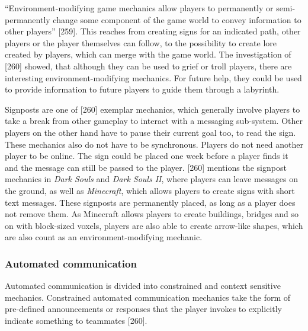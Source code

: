 ``Environment-modifying game mechanics allow players to permanently or semi-permanently change some component of the game world to convey information to other players'' \autocite{Toups2014ATheory}[259].
This reaches from creating signs for an indicated path, other players or the player themselves can follow, to the possibility to create lore created by players, which can merge with the game world. The investigation of \textcite{Toups2014ATheory}[260] showed, that although they can be used to grief or troll players, there are interesting environment-modifying mechanics.
For future help, they could be used to provide information to future players to guide them through a labyrinth.

Signposts are one of \textcite{Toups2014ATheory}[260] exemplar mechanics, which generally involve players to take a break from other gameplay to interact with a messaging sub-system. Other players on the other hand have to pause their current goal too, to read the sign. These mechanics also do not have to be synchronous.
Players do not need another player to be online. The sign could be placed one week before a player finds it and the message can still be passed to the player. \textcite{Cheung2012CommunicationGaming}[260] mentions the signpost mechanics in \textit{Dark Souls} and \textit{Dark Souls II}, where players can leave messages on the ground, as well as \textit{Minecraft}, which allows players to create signs with short text messages. These signposts are permanently placed, as long as a player does not remove them. As Minecraft allows players to create buildings, bridges and so on with block-sized voxels, players are also able to create arrow-like shapes, which are also count as an environment-modifying mechanic.


\subsubsection{Automated communication}
\label{section:Automated communication}

Automated communication is divided into constrained and context sensitive mechanics.
Constrained automated communication mechanics take the form of pre-defined announcements or responses that the player invokes to explicitly indicate something to teammates \autocite{Toups2014ATheory}[260].

